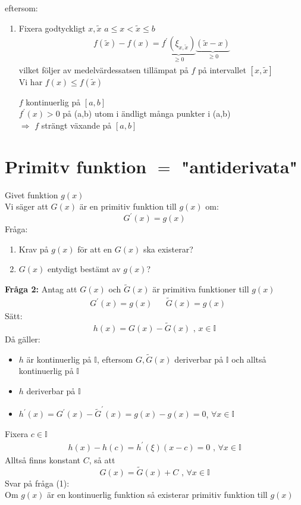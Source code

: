 eftersom:
\begin{enumerate}
    \item Fixera godtyckligt $x, \tilde{x}$ $a \le x < \tilde{x} \le b$
    \begin{align*}
        f(\tilde{x}) - f(x) = \underbrace{f^\prime(\xi_{x, \tilde{x}})}_{\ge 0} \underbrace{(\tilde{x} - x)}_{\ge 0}
    \end{align*}
    vilket följer av medelvärdessatsen tillämpat på $f$ på intervallet $[x, \tilde{x}]$\\
    Vi har $f(x) \le f(\tilde{x})$
    \begin{Rem}
        $f$ kontinuerlig på $[a,b]$\\
        $f^\prime(x) > 0$ på (a,b) utom i ändligt många punkter i (a,b)\\
        $\Rightarrow$ $f$ strängt växande på $[a,b]$
    \end{Rem}
\end{enumerate}
\section{Primitv funktion $=$ "antiderivata"} %
\label{sec:primitv_funktion}
Givet funktion $g(x)$\\
Vi säger att $G(x)$ är en primitiv funktion till $g(x)$ om:
\[
G^\prime(x) = g(x)
\]
Fråga:
\begin{enumerate}
    \item Krav på $g(x)$ för att en $G(x)$ ska existerar?
    \item $G(x)$ entydigt bestämt av $g(x)$?
\end{enumerate}
\textbf{Fråga 2:} Antag att $G(x)$ och $\tilde{G}(x)$ är primitiva funktioner till $g(x)$
\begin{align*}
    &G^\prime(x) = g(x) &&\tilde{G}(x) = g(x)
\end{align*}
Sätt:
\[
h(x) = G(x) - \tilde{G}(x)\mbox{ , } x\in \mathbb{I}
\]
Då gäller:
\begin{itemize}
    \item $h$ är kontinuerlig på $\mathbb{I}$, eftersom $G, \tilde{G}(x)$ deriverbar på $\mathbb{I}$ och alltså kontinuerlig på $\mathbb{I}$
    \item $h$ deriverbar på $\mathbb{I}$
    \item $h^\prime(x) = G^\prime(x) - \tilde{G}^\prime(x) = g(x) - g(x) = 0$, $\forall x \in \mathbb{I}$
\end{itemize}
Fixera $c \in \mathbb{I}$
\begin{align*}
    h(x) - h(c) = h^\prime(\xi)(x-c) = 0 \mbox{ , } \forall x \in \mathbb{I}
\end{align*}
Alltså finns konstant $C$, så att
\[
G(x) = \tilde{G}(x) + C \mbox{ , } \forall x \in \mathbb{I}
\]
Svar på fråga (1):\\
Om $g(x)$ är en kontinuerlig funktion så existerar primitiv funktion till $g(x)$
